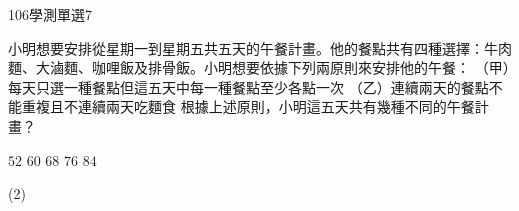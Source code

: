 \begin{QUESTIONS}
\begin{QUESTION}
    \end{QUESTION}
    \begin{QUESTION}
        \begin{ExamInfo}{106}{學測}{單選}{7}
        \end{ExamInfo}
        \begin{QBODY}
            小明想要安排從星期一到星期五共五天的午餐計畫。他的餐點共有四種選擇：牛肉麵、大滷麵、咖哩飯及排骨飯。小明想要依據下列兩原則來安排他的午餐：
        （甲）每天只選一種餐點但這五天中每一種餐點至少各點一次
        （乙）連續兩天的餐點不能重複且不連續兩天吃麵食
        根據上述原則，小明這五天共有幾種不同的午餐計畫？
        \begin{QOPS}
            \QOP $52$      
            \QOP $60$      
            \QOP $68$      
            \QOP $76$      
            \QOP $84$
        \end{QOPS}
        \end{QBODY}
        \begin{QFROMS}
        \end{QFROMS}
        \begin{QTAGS}
        \end{QTAGS}
        \begin{QANS}
            (2)
        \end{QANS}
        \begin{QSOL}
        \end{QSOL}
        \begin{QEMPTYSPACE}
        \end{QEMPTYSPACE}
    \end{QUESTION}

\end{QUESTIONS}